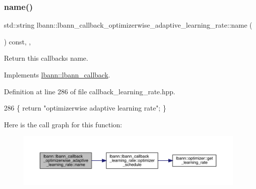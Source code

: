 \subsubsection{\texorpdfstring{name()}{name()}}
{\footnotesize\ttfamily std\+::string lbann\+::lbann\+\_\+callback\+\_\+optimizerwise\+\_\+adaptive\+\_\+learning\+\_\+rate\+::name (\begin{DoxyParamCaption}{ }\end{DoxyParamCaption}) const\hspace{0.3cm}{\ttfamily [inline]}, {\ttfamily [override]}, {\ttfamily [virtual]}}

Return this callback\textquotesingle{}s name. 

Implements \hyperlink{classlbann_1_1lbann__callback_a7522c7a14f1d6a1ea762cc2d7248eb3a}{lbann\+::lbann\+\_\+callback}.



Definition at line 286 of file callback\+\_\+learning\+\_\+rate.\+hpp.


\begin{DoxyCode}
286 \{ \textcolor{keywordflow}{return} \textcolor{stringliteral}{"optimizerwise adaptive learning rate"}; \}
\end{DoxyCode}
Here is the call graph for this function\+:\nopagebreak
\begin{figure}[H]
\begin{center}
\leavevmode
\includegraphics[width=350pt]{classlbann_1_1lbann__callback__optimizerwise__adaptive__learning__rate_a31120725bd22d1ce783a6edba9c5fb5d_cgraph}
\end{center}
\end{figure}
\mbox{\label{classlbann_1_1lbann__callback__optimizerwise__adaptive__learning__rate_a246fc2136f4210eb2c03b407a746adb8}} 

